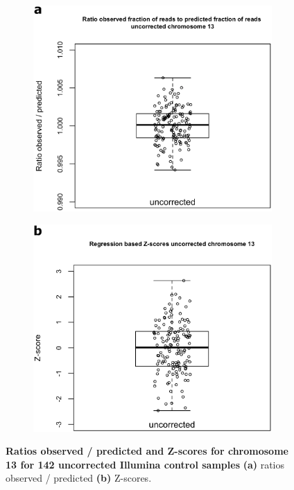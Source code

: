 \begin{figure}[h]
	\begin{subfigure}{.5\textwidth}
		\centering
		\includegraphics[width=1\linewidth]{img/NIPT_Supp3_Fig3_3a}
		\label{fig:NIPT_Supp3_Fig3_3a}
	\end{subfigure}%
	\begin{subfigure}{.5\textwidth}
		\centering
		\includegraphics[width=1\linewidth]{img/NIPT_Supp3_Fig3_3b}
		\label{fig:NIPT_Supp3_Fig3_3b}
	\end{subfigure} 
	\caption[Ratios observed / predicted and Z-scores for chromosome 13]{\textbf{Ratios observed / predicted and Z-scores for chromosome 13 for 142 uncorrected Illumina control samples} \textbf{(a)} ratios observed / predicted \textbf{(b)} Z-scores.}
	\label{fig:NIPT_Supp3_Fig3_3}
\end{figure}

